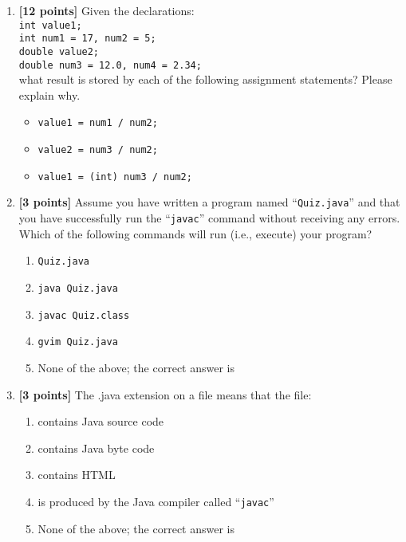 \begin{enumerate}
\item {\bf [12 points]}
Given the declarations:\\

{\tt int value1;}\\
{\tt int num1 = 17, num2 = 5;}\\
{\tt double value2;}\\
{\tt double num3 = 12.0, num4 = 2.34;}\\ 

 what result is stored by each of the following assignment statements? Please explain why.
 \begin{itemize}
 \item {\tt value1 = num1 / num2;}
 
\vspace{0.3in}
 \item {\tt value2 = num3 / num2;}
 
\vspace{0.3in}
 \item {\tt value1 = (int) num3 / num2;}
 
\vspace{0.3in}
 \end{itemize}


\item {\bf [3 points]}
Assume you have written a program named ``{\tt Quiz.java}'' and that you have 
successfully run the ``{\tt javac}'' command without receiving any  errors. 
Which of the following commands will run (i.e., execute) your program?
\begin{enumerate}
\item \verb$Quiz.java$

\medskip
\item \verb$java Quiz.java$

\medskip
\item \verb$javac Quiz.class$

\medskip 
\item \verb$gvim Quiz.java$

\medskip
\item None of the above; the correct answer is \underline{\hspace{3in}}
\end{enumerate}


\bigskip
\bigskip


\item {\bf [3 points]}
  The .java extension on a file means that the file:
  \begin{enumerate}
    \item contains Java source code
      \medskip 
    \item contains Java byte code
      \medskip
    \item contains HTML
      \medskip 
    \item is produced by the Java compiler called ``{\tt javac}''
      \medskip
    \item None of the above; the correct answer is \underline{\hspace{3in}}
  \end{enumerate}


\end{enumerate}
